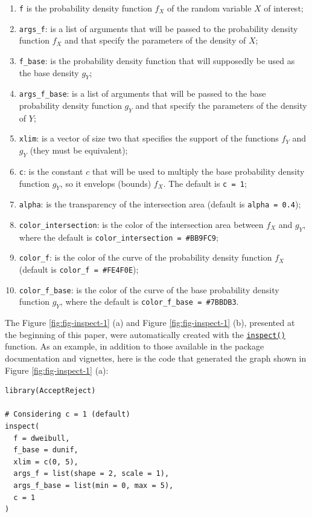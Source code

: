 \begin{enumerate}
\def\labelenumi{\arabic{enumi}.}
\tightlist
\item
  \texttt{f} is the probability density function \(f_X\) of the random variable \(X\) of interest;
\item
  \texttt{args\_f}: is a list of arguments that will be passed to the probability density function \(f_X\) and that specify the parameters of the density of \(X\);
\item
  \texttt{f\_base}: is the probability density function that will supposedly be used as the base density \(g_Y\);
\item
  \texttt{args\_f\_base}: is a list of arguments that will be passed to the base probability density function \(g_Y\) and that specify the parameters of the density of \(Y\);
\item
  \texttt{xlim}: is a vector of size two that specifies the support of the functions \(f_Y\) and \(g_Y\) (they must be equivalent);
\item
  \texttt{c}: is the constant \(c\) that will be used to multiply the base probability density function \(g_Y\), so it envelops (bounds) \(f_X\). The default is \texttt{c\ =\ 1};
\item
  \texttt{alpha}: is the transparency of the intersection area (default is \texttt{alpha\ =\ 0.4});
\item
  \texttt{color\_intersection}: is the color of the intersection area between \(f_X\) and \(g_Y\), where the default is \texttt{color\_intersection\ =\ \#BB9FC9};
\item
  \texttt{color\_f}: is the color of the curve of the probability density function \(f_X\) (default is \texttt{color\_f\ =\ \#FE4F0E});
\item
  \texttt{color\_f\_base}: is the color of the curve of the base probability density function \(g_Y\), where the default is \texttt{color\_f\_base\ =\ \#7BBDB3}.
\end{enumerate}

The Figure \ref{fig:fig-inspect-1} (a) and Figure \ref{fig:fig-inspect-1} (b), presented at the beginning of this paper, were automatically created with the \href{https://prdm0.github.io/AcceptReject/reference/inspect.html}{\texttt{inspect()}} function. As an example, in addition to those available in the package documentation and vignettes, here is the code that generated the graph shown in Figure \ref{fig:fig-inspect-1} (a):

\begin{verbatim}
library(AcceptReject)

# Considering c = 1 (default)
inspect(
  f = dweibull,
  f_base = dunif,
  xlim = c(0, 5),
  args_f = list(shape = 2, scale = 1),
  args_f_base = list(min = 0, max = 5),
  c = 1
)
\end{verbatim}


